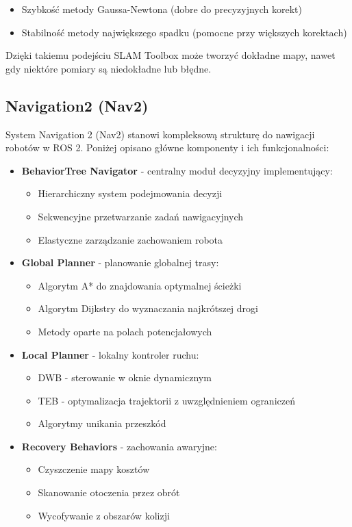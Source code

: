 \documentclass[a4paper,twoside,12pt]{book}
\begin{document}
\begin{itemize}
\item Szybkość metody Gaussa-Newtona (dobre do precyzyjnych korekt)
\item Stabilność metody największego spadku (pomocne przy większych korektach)
\end{itemize}

Dzięki takiemu podejściu SLAM Toolbox może tworzyć dokładne mapy, nawet gdy niektóre pomiary są niedokładne lub błędne.
\subsection{Navigation2 (Nav2)}
System Navigation 2 (Nav2) stanowi kompleksową strukturę do nawigacji robotów w ROS 2. Poniżej opisano główne komponenty i ich funkcjonalności:

\begin{itemize}
\item \textbf{BehaviorTree Navigator} - centralny moduł decyzyjny implementujący:
\begin{itemize}
	\item Hierarchiczny system podejmowania decyzji
	\item Sekwencyjne przetwarzanie zadań nawigacyjnych 
	\item Elastyczne zarządzanie zachowaniem robota
\end{itemize}

\item \textbf{Global Planner} - planowanie globalnej trasy:
\begin{itemize}
	\item Algorytm A* do znajdowania optymalnej ścieżki
	\item Algorytm Dijkstry do wyznaczania najkrótszej drogi
	\item Metody oparte na polach potencjałowych
\end{itemize}

\item \textbf{Local Planner} - lokalny kontroler ruchu:
\begin{itemize}
	\item DWB - sterowanie w oknie dynamicznym
	\item TEB - optymalizacja trajektorii z uwzględnieniem ograniczeń
	\item Algorytmy unikania przeszkód
\end{itemize}

\item \textbf{Recovery Behaviors} - zachowania awaryjne:
\begin{itemize}  
	\item Czyszczenie mapy kosztów
	\item Skanowanie otoczenia przez obrót
	\item Wycofywanie z obszarów kolizji
\end{itemize}
\end{itemize}
\end{document}
